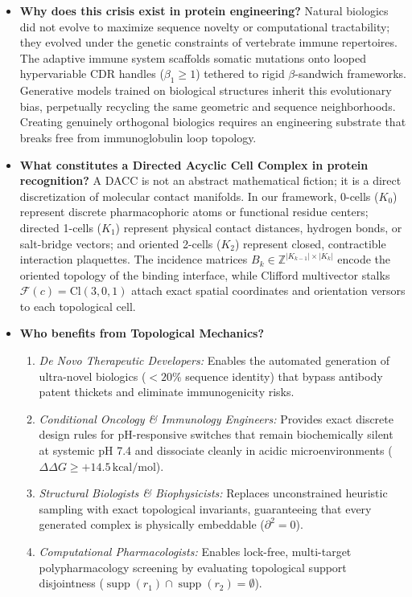 \begin{itemize}[leftmargin=1.2cm]
    \item \textbf{Why does this crisis exist in protein engineering?}  
    Natural biologics did not evolve to maximize sequence novelty or computational tractability; they evolved under the genetic constraints of vertebrate immune repertoires. The adaptive immune system scaffolds somatic mutations onto looped hypervariable CDR handles ($\beta_1 \ge 1$) tethered to rigid $\beta$-sandwich frameworks. Generative models trained on biological structures inherit this evolutionary bias, perpetually recycling the same geometric and sequence neighborhoods. Creating genuinely orthogonal biologics requires an engineering substrate that breaks free from immunoglobulin loop topology.

    \item \textbf{What constitutes a Directed Acyclic Cell Complex in protein recognition?}  
    A DACC is not an abstract mathematical fiction; it is a direct discretization of molecular contact manifolds. In our framework, 0-cells ($K_0$) represent discrete pharmacophoric atoms or functional residue centers; directed 1-cells ($K_1$) represent physical contact distances, hydrogen bonds, or salt-bridge vectors; and oriented 2-cells ($K_2$) represent closed, contractible interaction plaquettes. The incidence matrices $B_k \in \mathbb{Z}^{|K_{k-1}| \times |K_k|}$ encode the oriented topology of the binding interface, while Clifford multivector stalks $\mathcal{F}(c) = \text{Cl}(3,0,1)$ attach exact spatial coordinates and orientation versors to each topological cell.

    \item \textbf{Who benefits from Topological Mechanics?}  
    \begin{enumerate}
        \item \textit{De Novo Therapeutic Developers:} Enables the automated generation of ultra-novel biologics ($< 20\%$ sequence identity) that bypass antibody patent thickets and eliminate immunogenicity risks.
        \item \textit{Conditional Oncology \& Immunology Engineers:} Provides exact discrete design rules for pH-responsive switches that remain biochemically silent at systemic pH 7.4 and dissociate cleanly in acidic microenvironments ($\Delta\Delta G \ge +14.5\,\text{kcal/mol}$).
        \item \textit{Structural Biologists \& Biophysicists:} Replaces unconstrained heuristic sampling with exact topological invariants, guaranteeing that every generated complex is physically embeddable ($\partial^2 = 0$).
        \item \textit{Computational Pharmacologists:} Enables lock-free, multi-target polypharmacology screening by evaluating topological support disjointness ($\operatorname{supp}(r_1) \cap \operatorname{supp}(r_2) = \emptyset$).
    \end{enumerate}


\end{itemize}
